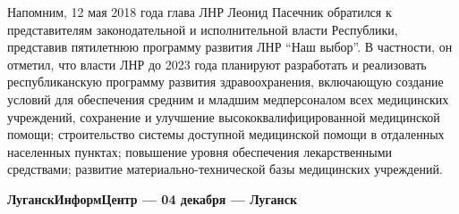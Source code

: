 Напомним, 12 мая 2018 года глава ЛНР Леонид Пасечник обратился к представителям
законодательной и исполнительной власти Республики, представив пятилетнюю
программу развития ЛНР \enquote{Наш выбор}. В частности, он отметил, что власти ЛНР до
2023 года планируют разработать и реализовать республиканскую программу
развития здравоохранения, включающую создание условий для обеспечения средним и
младшим медперсоналом всех медицинских учреждений, сохранение и улучшение
высококвалифицированной медицинской помощи; строительство системы доступной
медицинской помощи в отдаленных населенных пунктах; повышение уровня
обеспечения лекарственными средствами; развитие материально-технической базы
медицинских учреждений.

{\bfseries 
ЛуганскИнформЦентр — 04 декабря — Луганск
}

